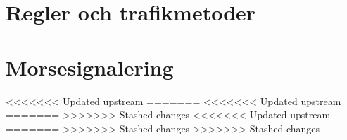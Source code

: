 \chapter{Regler och trafikmetoder}
% 
%
\chapter{Morsesignalering}
% 
%
<<<<<<< Updated upstream
\appendix
=======
<<<<<<< Updated upstream
%
% 
% 
% 
% 
% 
% 
% 
% 
% 
% 
% 
=======
>>>>>>> Stashed changes
%
%
%
%
%
%
%
%
%
%
%
%
%
%
<<<<<<< Updated upstream
=======
>>>>>>> Stashed changes
>>>>>>> Stashed changes
